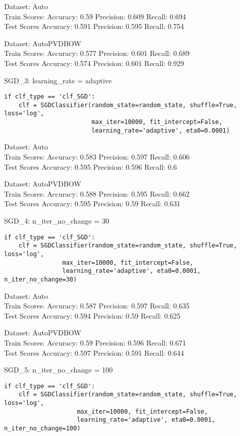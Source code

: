 \documentclass[11pt,preprint, authoryear]{elsarticle}
\numberwithin{equation}{section}
\numberwithin{figure}{section}
\numberwithin{table}{section}
\begin{document}
Dataset: Auto\\
Train Scores: Accuracy: 0.59 Precision: 0.609 Recall: 0.694\\
Test Scores Accuracy: 0.591 Precision: 0.595 Recall: 0.754

Dataset: AutoPVDBOW\\
Train Scores: Accuracy: 0.577 Precision: 0.601 Recall: 0.689\\
Test Scores Accuracy: 0.574 Precision: 0.601 Recall: 0.929

SGD\_3: learning\_rate = adaptive

\begin{verbatim}
if clf_type == 'clf_SGD':
    clf = SGDClassifier(random_state=random_state, shuffle=True, loss='log',
                        max_iter=10000, fit_intercept=False,
                        learning_rate='adaptive', eta0=0.0001)
\end{verbatim}

Dataset: Auto\\
Train Scores: Accuracy: 0.583 Precision: 0.597 Recall: 0.606\\
Test Scores Accuracy: 0.595 Precision: 0.596 Recall: 0.6

Dataset: AutoPVDBOW\\
Train Scores: Accuracy: 0.588 Precision: 0.595 Recall: 0.662\\
Test Scores Accuracy: 0.595 Precision: 0.59 Recall: 0.631

SGD\_4: n\_iter\_no\_change = 30

\begin{verbatim}
if clf_type == 'clf_SGD':
    clf = SGDClassifier(random_state=random_state, shuffle=True, loss='log', 
                max_iter=10000, fit_intercept=False,
                learning_rate='adaptive', eta0=0.0001, n_iter_no_change=30)
\end{verbatim}

Dataset: Auto\\
Train Scores: Accuracy: 0.587 Precision: 0.597 Recall: 0.635\\
Test Scores Accuracy: 0.594 Precision: 0.59 Recall: 0.625

Dataset: AutoPVDBOW\\
Train Scores: Accuracy: 0.59 Precision: 0.596 Recall: 0.671\\
Test Scores Accuracy: 0.597 Precision: 0.591 Recall: 0.644

SGD\_5: n\_iter\_no\_change = 100

\begin{verbatim}
if clf_type == 'clf_SGD':
    clf = SGDClassifier(random_state=random_state, shuffle=True, loss='log', 
                    max_iter=10000, fit_intercept=False,
                    learning_rate='adaptive', eta0=0.0001, n_iter_no_change=100)
\end{verbatim}
\end{document}
